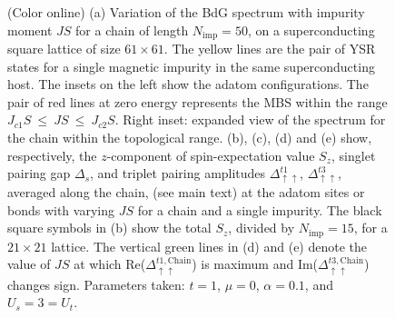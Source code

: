 \documentclass[aps,prl,reprint,nobibnotes]{revtex4-1}
\begin{document}
\begin{figure}[t]
\begin{center}
 \vspace{-1em}
\caption{(Color online) (a) Variation of the BdG spectrum with impurity moment $JS$ for a chain of length $N_{\text{imp}}=50$, on a superconducting square lattice of size $61 \times 61$. The yellow lines are the pair of YSR states for a single magnetic impurity in the same superconducting host. The insets on the left show the adatom configurations. The pair of red lines at zero energy represents the MBS within the range $J_{c1}S~\leq~JS~\leq~J_{c2}S$. Right inset: expanded view of the spectrum for the chain within the topological range. (b), (c), (d) and (e) show, respectively, the $z$-component of spin-expectation value $S_z$, singlet pairing gap $\Delta_s$, and triplet pairing amplitudes $\Delta_{\uparrow \uparrow}^{t1}$, $\Delta_{\uparrow \uparrow}^{t3}$, averaged along the chain, (see main text) at the adatom sites or bonds with varying $JS$ for a chain and a single impurity. The black square symbols in (b) show the total $S_z$, divided by $N_{\text{imp}}=15$, for a $21\times21$ lattice. The vertical green lines in (d) and (e) denote the value of $JS$ at which Re($\Delta_{\uparrow \uparrow}^{t1, \text{Chain}}$) is maximum and Im($\Delta_{\uparrow \uparrow}^{t3, \text{Chain}}$) changes sign. Parameters taken: $t=1$, $\mu=0$, $\alpha=0.1$, and $U_s=3=U_t$.}
\label{Jvar}
\end{center}
\end{figure}
\end{document}
